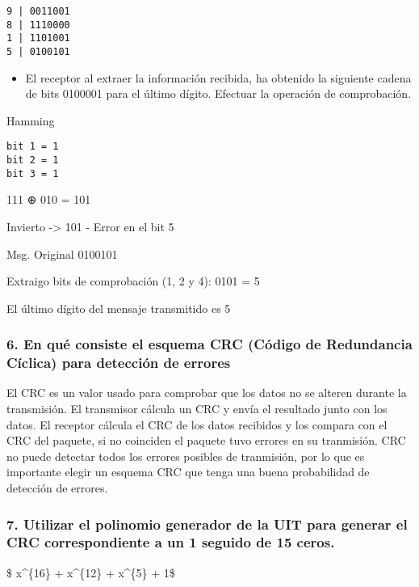 \documentclass{article}
\begin{document}
\begin{verbatim}
9 | 0011001
8 | 1110000
1 | 1101001
5 | 0100101
\end{verbatim}

\begin{itemize}
\itemsep1pt\parskip0pt
\item
  El receptor al extraer la información recibida, ha obtenido la
  siguiente cadena de bits 0100001 para el último dígito. Efectuar la
  operación de comprobación.
\end{itemize}

Hamming

\begin{verbatim}
bit 1 = 1
bit 2 = 1
bit 3 = 1
\end{verbatim}

111 ⊕ 010 = 101

Invierto -\textgreater{} 101 - Error en el bit 5

Msg. Original 0100101

Extraigo bits de comprobación (1, 2 y 4): 0101 = 5

El último dígito del mensaje transmitido es 5

\subsubsection{6. En qué consiste el esquema CRC (Código de Redundancia
Cíclica) para detección de
errores}\label{en-quuxe9-consiste-el-esquema-crc-cuxf3digo-de-redundancia-cuxedclica-para-detecciuxf3n-de-errores}

El CRC es un valor usado para comprobar que los datos no se alteren
durante la transmisión. El transmisor cálcula un CRC y envía el
resultado junto con los datos. El receptor cálcula el CRC de los datos
recibidos y los compara con el CRC del paquete, si no coinciden el
paquete tuvo errores en su tranmisión. CRC no puede detectar todos los
errores posibles de tranmisión, por lo que es importante elegir un
esquema CRC que tenga una buena probabilidad de detección de errores.

\subsubsection{7. Utilizar el polinomio generador de la UIT para generar
el CRC correspondiente a un 1 seguido de 15
ceros.}\label{utilizar-el-polinomio-generador-de-la-uit-para-generar-el-crc-correspondiente-a-un-1-seguido-de-15-ceros.}

\$  x\^{}\{16\} + x\^{}\{12\} +
x\^{}\{5\} + 1\$
\end{document}
